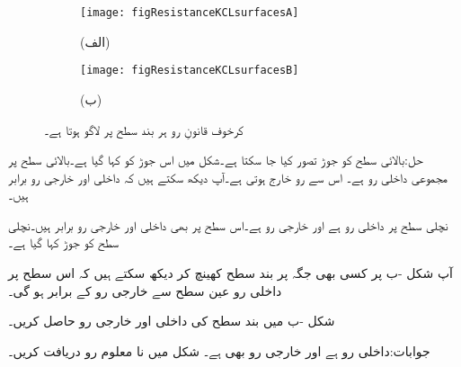 \begin{figure}
\centering
\begin{subfigure}{0.5\textwidth}
\centering
\texttt{[image: figResistanceKCLsurfacesA]}
\caption*{(الف)}
\end{subfigure}%
%
\begin{subfigure}{0.5\textwidth}
\centering
\texttt{[image: figResistanceKCLsurfacesB]}
\caption*{(ب)}
\end{subfigure}%
\caption{کرخوف قانونِ رو ہر بند سطح پر لاگو ہوتا ہے۔}
\label{شکل_مزاحمتی_بند_سطح_قانون_رو}
\end{figure}

حل:بالائی سطح کو جوڑ تصور کیا جا سکتا ہے۔شکل میں اس جوڑ کو  کہا گیا ہے۔بالائی سطح پر مجموعی داخلی رو
  ہے۔ اس سے  رو خارج ہوتی ہے۔آپ دیکھ سکتے ہیں کہ داخلی اور خارجی رو برابر ہیں۔

نچلی سطح پر داخلی رو  ہے اور خارجی رو  ہے۔اس سطح پر بھی داخلی اور خارجی رو برابر ہیں۔نچلی سطح کو جوڑ  کہا گیا ہے۔ 
\FloatBarrier

آپ شکل -ب پر کسی بھی جگہ پر بند سطح کھینچ کر دیکھ سکتے ہیں کہ اس سطح پر داخلی رو عین سطح سے خارجی رو کے برابر ہو گی۔

شکل -ب میں بند سطح کی داخلی اور خارجی رو حاصل کریں۔

جوابات:داخلی رو  ہے اور خارجی رو بھی  ہے۔
\FloatBarrier
شکل  میں نا معلوم رو دریافت کریں۔    

